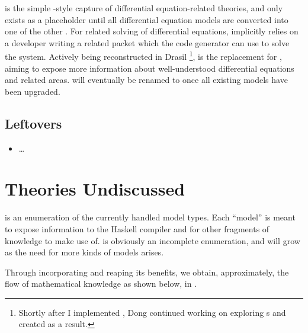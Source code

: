 \DEModel{} is the simple \RelationConcept{}-style capture of differential
equation-related theories, and only exists as a placeholder until all
differential equation models are converted into one of the other \ModelKinds{}.
For related solving of differential equations, \DEModel{} implicitly relies on a
developer writing a related \ODEInfo{} packet which
the code generator can use to solve the system. Actively being reconstructed in
Drasil \cite{Chen2022MEng} \footnote{Shortly after I implemented \ModelKind{},
Dong continued working on exploring \DEModel{}s and created \NewDEModel{} as a
result.}, \NewDEModel{} is the replacement for \DEModel{}, aiming to expose more
information about well-understood differential equations and related areas.
\NewDEModel{} will eventually be renamed to \DEModel{} once all existing
\DEModel{} models have been upgraded.


\subsection{Leftovers}


\begin{itemize}

	\item \OthModel{} \ldots{}

\end{itemize}

\section{Theories Undiscussed}

\ModelKinds{} is an enumeration of the currently handled model types. Each
``model'' is meant to expose information to the Haskell compiler and for other
fragments of knowledge to make use of. \ModelKinds{} is obviously an incomplete
enumeration, and will grow as the need for more kinds of models arises.

Through incorporating \ModelKinds{} and reaping its benefits, we obtain,
approximately, the flow of mathematical knowledge as shown below, in
.

